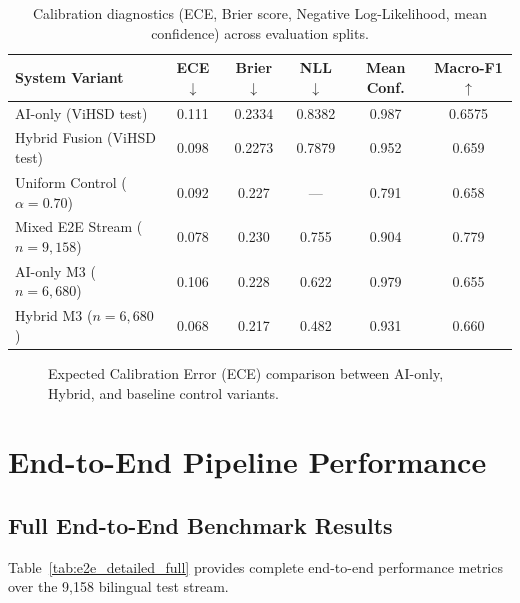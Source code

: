 \documentclass[runningheads]{llncs}
\begin{document}
\begin{table}[H]
\centering
\caption{Calibration diagnostics (ECE, Brier score, Negative Log-Likelihood, mean confidence) across evaluation splits.}
\label{tab:calibration_full}
\begin{tabular}{lccccc}
\toprule
System Variant & ECE $\downarrow$ & Brier $\downarrow$ & NLL $\downarrow$ & Mean Conf. & Macro-F1 $\uparrow$ \\
\midrule
AI-only (ViHSD test) & 0.111 & 0.2334 & 0.8382 & 0.987 & 0.6575 \\
Hybrid Fusion (ViHSD test) & 0.098 & 0.2273 & 0.7879 & 0.952 & 0.659 \\
Uniform Control ($\alpha=0.70$) & 0.092 & 0.227 & --- & 0.791 & 0.658 \\
Mixed E2E Stream ($n=9{,}158$) & 0.078 & 0.230 & 0.755 & 0.904 & 0.779 \\
\midrule
AI-only M3 ($n=6{,}680$) & 0.106 & 0.228 & 0.622 & 0.979 & 0.655 \\
Hybrid M3 ($n=6{,}680$) & 0.068 & 0.217 & 0.482 & 0.931 & 0.660 \\
\bottomrule
\end{tabular}
\end{table}

\begin{figure}[H]
\centering
{}
\caption{Expected Calibration Error (ECE) comparison between AI-only, Hybrid, and baseline control variants.}
\label{fig:ece_comparison}
\end{figure}

\section{End-to-End Pipeline Performance}
\subsection{Full End-to-End Benchmark Results}
Table~\ref{tab:e2e_detailed_full} provides complete end-to-end performance metrics over the 9,158 bilingual test stream.
\end{document}
